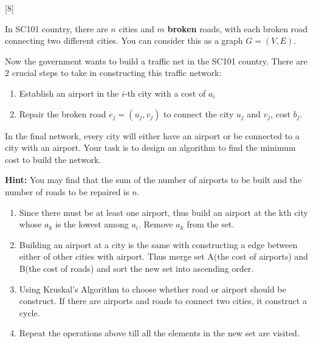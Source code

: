 [8]

In SC101 country, there are $n$ cities and $m$ \textbf{broken} roads, with each broken road connecting two different cities. You can consider this as a graph $G=(V, E)$.

Now the government wants to build a traffic net in the SC101 country. There are $2$ crucial steps to take in constructing this traffic network:
\begin{enumerate}
    \item Establish an airport in the $i$-th city with a cost of $a_i$
    \item Repair the broken road $e_j = (u_j, v_j)$ to connect the city $u_j$ and $v_j$, cost $b_j$.
\end{enumerate}
In the final network, every city will either have an airport or be connected to a city with an airport. Your task is to design an algorithm to find the minimum cost to build the network.

\textbf{Hint:} You may find that the sum of the number of airports to be built and the number of roads to be repaired is $n$.

\begin{solution}
    \begin{enumerate}
        \item Since there must be at least one airport, thus build an airport at the kth city whose $a_k$ is the lowest among $a_i$. Remove $a_k$ from the set.
        \item Building an airport at a city is the same with constructing a edge between either of other cities with airport.
              Thus merge set A(the cost of airports) and B(the cost of roads) and sort the new set into ascending order.
        \item Using Kruskal's Algorithm to choose whether road or airport should be construct.
              If there are airports and roads to connect two cities, it construct a cycle.
        \item Repeat the operations above till all the elements in the new set are visited.
    \end{enumerate}
\end{solution}